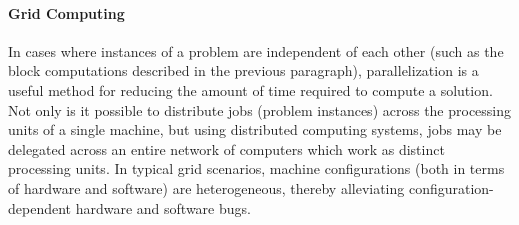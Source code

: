 \paragraph{Grid Computing}
In cases where instances of a problem are independent of each other (such as the block computations described in the previous paragraph), parallelization is a useful method for reducing the amount of time required to compute a solution. Not only is it possible to distribute jobs (problem instances) across the processing units of a single machine, but using distributed computing systems, jobs may be delegated across an entire network of computers which work as distinct processing units. In typical grid scenarios, machine configurations (both in terms of hardware and software) are heterogeneous, thereby alleviating configuration-dependent hardware and software bugs. 